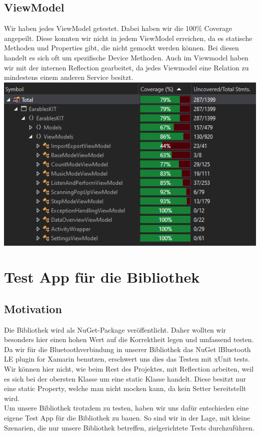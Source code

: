 \documentclass[a4paper,12pt]{article}
\begin{document}
\subsection{ViewModel}
Wir haben jedes ViewModel getestet. Dabei haben wir die 100\% Coverage angepeilt. Diese konnten wir nicht in jedem ViewModel erreichen, da es statische Methoden und Properties gibt, die nicht gemockt werden können. Bei diesen handelt es sich oft um spezifische Device Methoden. Auch im Viewmodel haben wir mit der internen Reflection gearbeitet, da jedes Viewmodel eine Relation zu mindestens einem anderen Service besitzt.\\
\newline
\includegraphics[width=1\textwidth]{./bilder/Coverage/CoverageViewModels.PNG}

\section{Test App für die Bibliothek}
\subsection{Motivation}
Die Bibliothek wird als NuGet-Package veröffentlicht. Daher wollten wir besonders hier einen hohen Wert auf die Korrektheit legen und umfassend testen.\\
Da wir für die Bluetoothverbindung in unserer Bibliothek das NuGet \glqq{}lBluetooth LE plugin for Xamarin\grqq{} benutzen, erschwert uns dies das Testen mit xUnit tests. Wir können hier nicht, wie beim Rest des Projektes, mit Reflection arbeiten, weil es sich bei der \glqq{}obersten Klasse\grqq{} um eine static Klasse handelt. Diese besitzt nur eine static Property, welche man nicht mocken kann, da kein Setter bereitstellt wird.\\
 Um unsere Bibliothek trotzdem zu testen, haben wir uns dafür entschieden eine eigene Test App für die Bibliothek zu bauen. So sind wir in der Lage, mit kleine Szenarien, die nur unsere Bibliothek betreffen, zielgerichtete Tests durchzuführen.
\end{document}
